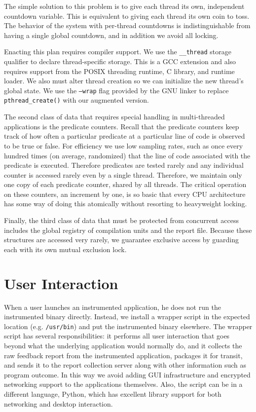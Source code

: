 \documentclass[10pt,twocolumn]{article}
\begin{document}
The simple solution to this problem is to give each thread its own,
independent countdown variable.  This is equivalent to giving each
thread its own coin to toss.  The behavior of the system with
per-thread countdowns is indistinguishable from having a single global
countdown, and in addition we avoid all locking.

Enacting this plan requires compiler support.  We use the
\texttt{\_\_thread} storage qualifier to declare thread-specific
storage.  This is a GCC extension and also requires support from the
POSIX threading runtime, C library, and runtime loader.  We also must
alter thread creation so we can initialize the new thread's global
state.  We use the \texttt{--wrap} flag provided by the GNU linker to
replace \texttt{pthread\_create()} with our augmented version.

The second class of data that requires special handling in
multi-threaded applications is the predicate counters.  Recall that
the predicate counters keep track of how often a particular predicate
at a particular line of code is observed to be true or false.  For
efficiency we use low sampling rates, such as once every hundred times
(on average, randomized) that the line of code associated with the
predicate is executed.  Therefore predicates are tested rarely and any
individual counter is accessed rarely even by a single thread.
Therefore, we maintain only one copy of each predicate counter, shared
by all threads.  The critical operation on these counters, an
increment by one, is so basic that every CPU architecture has some way
of doing this atomically without resorting to heavyweight locking.

Finally, the third class of data that must be protected from
concurrent access includes the global registry of compilation units
and the report file.  Because these structures are accessed very
rarely, we guarantee exclusive access by guarding each with its own
mutual exclusion lock.


\section{User Interaction}

When a user launches an instrumented application, he does not run the
instrumented binary directly.  Instead, we install a wrapper script in
the expected location (e.g. \texttt{/usr/bin}) and put the
instrumented binary elsewhere.  The wrapper script has several
responsibilities: it performs all user interaction that goes beyond
what the underlying application would normally do, and it collects the
raw feedback report from the instrumented application, packages it for
transit, and sends it to the report collection server along with other
information such as program outcome.  In this way we avoid adding GUI
infrastructure and encrypted networking support to the applications
themselves.  Also, the script can be in a different language, Python,
which has excellent library support for both networking and desktop
interaction.
\end{document}
